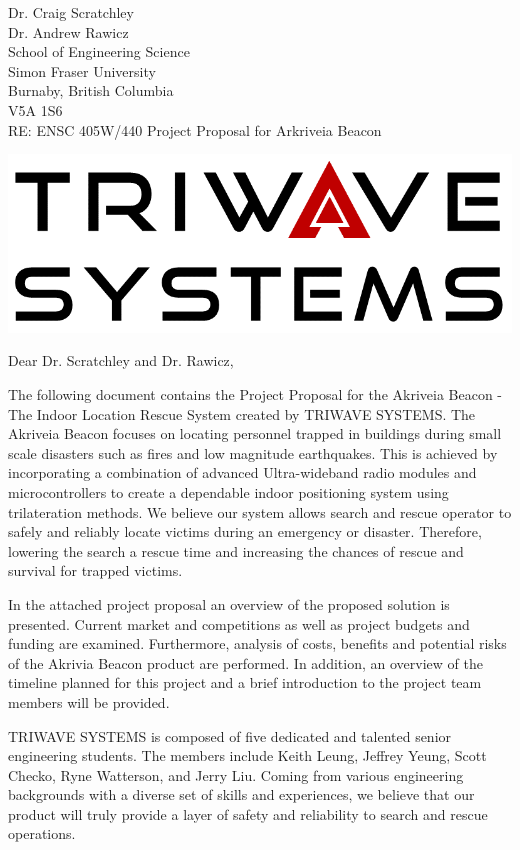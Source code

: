 \documentclass[11pt]{letter}
\date{July 21, 2019}
\begin{document}
\begin{letter}{
Dr. Craig Scratchley\\
Dr. Andrew Rawicz\\
School of Engineering Science\\
Simon Fraser University\\
Burnaby, British Columbia\\
V5A 1S6\\
\bigskip
RE: ENSC 405W/440 Project Proposal for Arkriveia Beacon\\
} 


\begin{center}
\includegraphics[scale=0.3]{./images/logo_W.png}
\end{center}

\opening{Dear Dr. Scratchley and Dr. Rawicz,} 
 
 \bigskip
The following document contains the Project Proposal for the Akriveia Beacon - The Indoor Location Rescue System created by TRIWAVE SYSTEMS. The Akriveia Beacon focuses on locating personnel trapped in buildings during small scale disasters such as fires and low magnitude earthquakes. This is achieved by incorporating a combination of advanced Ultra-wideband radio modules and microcontrollers to create a dependable indoor positioning system using trilateration methods. We believe our system allows search and rescue operator to safely and reliably locate victims during an emergency or disaster. Therefore, lowering the search a rescue time and increasing the chances of rescue and survival for trapped victims.

\bigskip
In the attached project proposal an overview of the proposed solution is presented. Current market and competitions as well as project budgets and funding are examined. Furthermore, analysis of costs, benefits and potential risks of the Akrivia Beacon product are performed. In addition, an overview of the timeline planned for this project and a brief introduction to the project team members will be provided.

\bigskip
TRIWAVE SYSTEMS is composed of five dedicated and talented senior engineering students. The members include Keith Leung, Jeffrey Yeung, Scott Checko, Ryne Watterson, and Jerry Liu. Coming from various engineering backgrounds with a diverse set of skills and experiences, we believe that our product will truly provide a layer of safety and reliability to search and rescue operations.


\end{letter}
\end{document}
